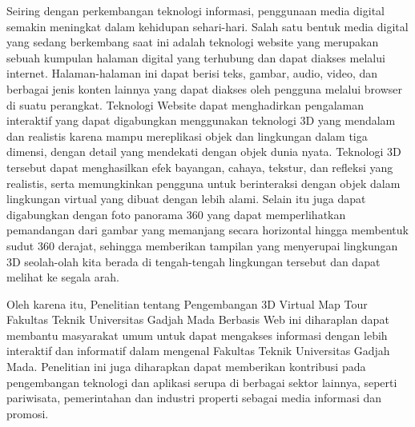 Seiring dengan perkembangan teknologi informasi, penggunaan media digital semakin meningkat dalam kehidupan sehari-hari. Salah satu bentuk media digital yang sedang berkembang saat ini adalah teknologi website yang merupakan sebuah kumpulan halaman digital yang terhubung dan dapat diakses melalui internet. Halaman-halaman ini dapat berisi teks, gambar, audio, video, dan berbagai jenis konten lainnya yang dapat diakses oleh pengguna melalui browser di suatu perangkat. Teknologi Website dapat menghadirkan pengalaman interaktif yang dapat digabungkan menggunakan teknologi 3D yang mendalam dan realistis karena mampu mereplikasi objek dan lingkungan dalam tiga dimensi, dengan detail yang mendekati dengan objek dunia nyata. Teknologi 3D tersebut dapat menghasilkan efek bayangan, cahaya, tekstur, dan refleksi yang realistis, serta memungkinkan pengguna untuk berinteraksi dengan objek dalam lingkungan virtual yang dibuat dengan lebih alami. Selain itu juga dapat digabungkan dengan foto panorama 360 yang dapat memperlihatkan pemandangan dari gambar yang memanjang secara horizontal hingga membentuk sudut 360 derajat, sehingga memberikan tampilan yang menyerupai lingkungan 3D seolah-olah kita berada di tengah-tengah lingkungan tersebut dan dapat melihat ke segala arah.

Oleh karena itu, Penelitian tentang Pengembangan 3D Virtual Map Tour Fakultas Teknik Universitas Gadjah Mada Berbasis Web ini diharaplan dapat membantu masyarakat umum untuk dapat mengakses informasi dengan lebih interaktif dan informatif dalam mengenal Fakultas Teknik Universitas Gadjah Mada. Penelitian ini juga diharapkan dapat memberikan kontribusi pada pengembangan teknologi dan aplikasi serupa di berbagai sektor lainnya, seperti pariwisata, pemerintahan dan industri properti sebagai media informasi dan promosi.
				
		

